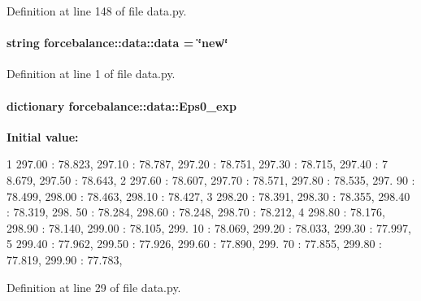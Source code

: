 \-Definition at line 148 of file data.\-py.

\hypertarget{namespaceforcebalance_1_1data_a3f325d696a5bf504db1219d69a4e5a43}{
\paragraph[{data}]{\setlength{\rightskip}{0pt plus 5cm}string {\bf forcebalance\-::data\-::data} = \char`\"{}new\char`\"{}}}\label{namespaceforcebalance_1_1data_a3f325d696a5bf504db1219d69a4e5a43}


\-Definition at line 1 of file data.\-py.

\hypertarget{namespaceforcebalance_1_1data_a27f89d8e25ee5771a00f60c8601ea06e}{
\paragraph[{\-Eps0\-\_\-exp}]{\setlength{\rightskip}{0pt plus 5cm}dictionary {\bf forcebalance\-::data\-::\-Eps0\-\_\-exp}}}\label{namespaceforcebalance_1_1data_a27f89d8e25ee5771a00f60c8601ea06e}
{\bfseries \-Initial value\-:}
\begin{DoxyCode}
1 {297.00 : 78.823, 297.10 : 78.787, 297.20 : 78.751, 297.30 : 78.715, 297.40 : 7
      8.679, 297.50 : 78.643, 
2                         297.60 : 78.607, 297.70 : 78.571, 297.80 : 78.535, 297.
      90 : 78.499, 298.00 : 78.463, 298.10 : 78.427, 
3                         298.20 : 78.391, 298.30 : 78.355, 298.40 : 78.319, 298.
      50 : 78.284, 298.60 : 78.248, 298.70 : 78.212, 
4                         298.80 : 78.176, 298.90 : 78.140, 299.00 : 78.105, 299.
      10 : 78.069, 299.20 : 78.033, 299.30 : 77.997, 
5                         299.40 : 77.962, 299.50 : 77.926, 299.60 : 77.890, 299.
      70 : 77.855, 299.80 : 77.819, 299.90 : 77.783, }
\end{DoxyCode}


\-Definition at line 29 of file data.\-py.

